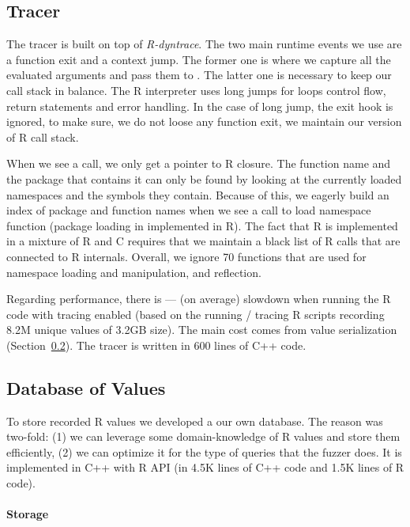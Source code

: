 \documentclass[sigplan,anonymous,review]{acmart}
\begin{document}
\subsection{Tracer}\label{sec:argtracer}

The tracer is built on top of \emph{R-dyntrace}.
The two main runtime events we use are a function exit and a context jump.
The former one is where we capture all the evaluated arguments and pass them to \sxpdb.
The latter one is necessary to keep our call stack in balance.
The R interpreter uses long jumps for loops control flow, return statements and error handling.
In the case of long jump, the exit hook is ignored, to make sure, we do not loose any function exit, we maintain our version of R call stack.

When we see a call, we only get a pointer to R closure.
The function name and the package that contains it can only be found by looking at the currently loaded namespaces and the symbols they contain.
Because of this, we eagerly build an index of package and function names when we see a call to load namespace function (package loading in implemented in R).
The fact that R is implemented in a mixture of R and C requires that we maintain a black list of R calls that are connected to R internals.
Overall, we ignore 70 functions that are used for namespace loading and manipulation, and reflection.

Regarding performance, there is \TRMinTracingOverhead --- \TRMaxTracingOverhead (\TRAvgTracingOverhead on average) slowdown when running the R code with tracing enabled (based on the running / tracing \TRTracingFiles R scripts recording 8.2M unique values of 3.2GB size).
The main cost comes from value serialization (\Cf Section~\ref{sec:sxpdb}).
The tracer is written in 600 lines of C++ code.

\subsection{Database of Values}\label{sec:sxpdb}

To store recorded R values we developed a our own database.
The reason was two-fold: (1) we can leverage some domain-knowledge of R values and store them efficiently, (2) we can optimize it for the type of queries that the fuzzer does.
It is implemented in C++ with R API (in 4.5K lines of C++ code and 1.5K lines of R code).

\paragraph{Storage}
\end{document}
